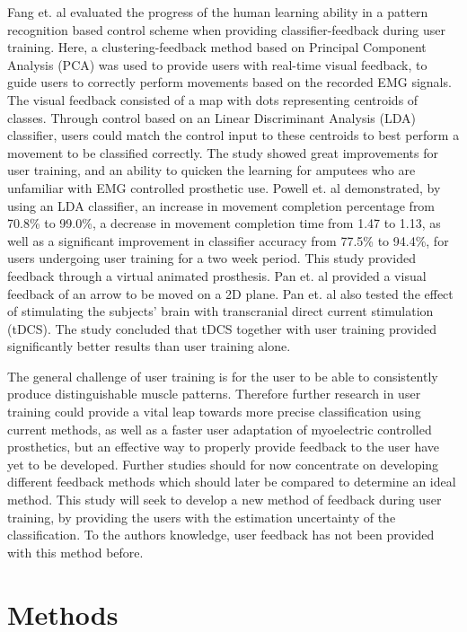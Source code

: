 Fang et. al \cite{Fang2017} evaluated the progress of the human learning ability in a pattern recognition based control scheme when providing classifier-feedback during user training. Here, a clustering-feedback method based on Principal Component Analysis (PCA) was used to provide users with real-time visual feedback, to guide users to correctly perform movements based on the recorded EMG signals. The visual feedback consisted of a map with dots representing centroids of classes. Through control based on an Linear Discriminant Analysis (LDA) classifier, users could match the control input to these centroids to best perform a movement to be classified correctly. The study showed great improvements for user training, and an ability to quicken the learning for amputees who are unfamiliar with EMG controlled prosthetic use. \cite{Fang2017}
Powell et. al \cite{Powell2014} demonstrated, by using an LDA classifier, an increase in movement completion percentage from 70.8\% to 99.0\%, a decrease in movement completion time from 1.47 to 1.13, as well as a significant improvement in classifier accuracy from 77.5\% to 94.4\%, for users undergoing user training for a two week period. This study provided feedback through a virtual animated prosthesis.
Pan et. al \cite{Pan2017} provided a visual feedback of an arrow to be moved on a 2D plane. Pan et. al also tested the effect of stimulating the subjects’ brain with transcranial direct current stimulation (tDCS). The study concluded that tDCS together with user training provided significantly better results than user training alone. \cite{Pan2017}

The general challenge of user training is for the user to be able to consistently produce distinguishable muscle patterns. \cite{Powell2014} Therefore further research in user training could provide a vital leap towards more precise classification using current methods, as well as a faster user adaptation of myoelectric controlled prosthetics, but an effective way to properly provide feedback to the user have yet to be developed. 
Further studies should for now concentrate on developing different feedback methods which should later be compared to determine an ideal method. 
This study will seek to develop a new method of feedback during user training, by providing the users with the estimation uncertainty of the classification. To the authors knowledge, user feedback has not been provided with this method before.

\section{Methods}

